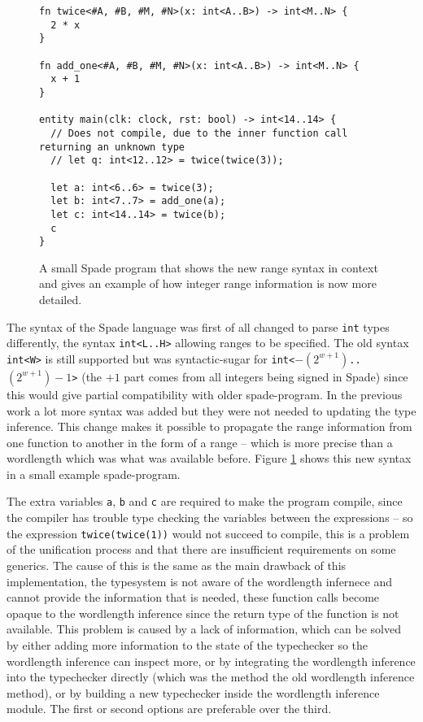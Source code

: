 \begin{figure}[h!]
  \begin{verbatim}
fn twice<#A, #B, #M, #N>(x: int<A..B>) -> int<M..N> {
  2 * x
}

fn add_one<#A, #B, #M, #N>(x: int<A..B>) -> int<M..N> {
  x + 1
}

entity main(clk: clock, rst: bool) -> int<14..14> {
  // Does not compile, due to the inner function call returning an unknown type
  // let q: int<12..12> = twice(twice(3));

  let a: int<6..6> = twice(3);
  let b: int<7..7> = add_one(a);
  let c: int<14..14> = twice(b);
  c
}
  \end{verbatim}
  \caption{A small Spade program that shows the new range syntax in context and gives an example of how integer range information is now more detailed.}
  \label{fig:BetterProgram}
\end{figure}

The syntax of the Spade language was first of all changed to parse \verb+int+ types differently, the syntax \verb+int<L..H>+ allowing ranges to be specified. The old syntax \verb+int<W>+ is still supported but was syntactic-sugar for \verb!int<!$-(2^{w+1})$\verb!..!$(2^{w+1})-1$\verb!>! (the $+1$ part comes from all integers being signed in Spade) since this would give partial compatibility with older spade-program. In the previous work a lot more syntax was added but they were not needed to updating the type inference. This change makes it possible to propagate the range information from one function to another in the form of a range -- which is more precise than a wordlength which was what was available before. Figure \ref{fig:BetterProgram} shows this new syntax in a small example spade-program.

The extra variables \verb+a+, \verb+b+ and \verb+c+ are required to make the program compile, since the compiler has trouble type checking the variables between the expressions -- so the expression \verb+twice(twice(1))+ would not succeed to compile, this is a problem of the unification process and that there are insufficient requirements on some generics. The cause of this is the same as the main drawback of this implementation, the typesystem is not aware of the wordlength infernece and cannot provide the information that is needed, these function calls become opaque to the wordlength inference since the return type of the function is not available. This problem is caused by a lack of information, which can be solved by either adding more information to the state of the typechecker so the wordlength inference can inspect more, or by integrating the wordlength inference into the typechecker directly (which was the method the old wordlength inference method), or by building a new typechecker inside the wordlength inference module. The first or second options are preferable over the third.

